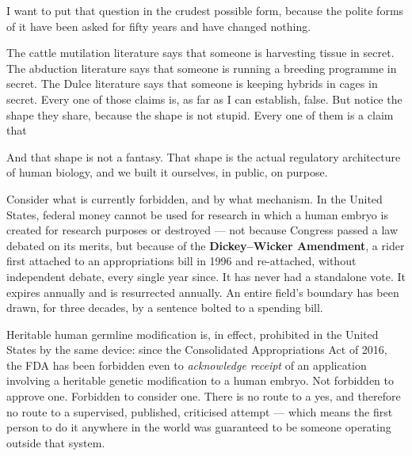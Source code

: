 I want to put that question in the crudest possible form, because the polite forms of it have been
asked for fifty years and have changed nothing.

The cattle mutilation literature says that someone is harvesting tissue in secret. The abduction
literature says that someone is running a breeding programme in secret. The Dulce literature says
that someone is keeping hybrids in cages in secret. Every one of those claims is, as far as I can
establish, false. But notice the shape they share, because the shape is not stupid. Every one of
them is a claim that 

And that shape is not a fantasy. That shape is the actual regulatory architecture of human
biology, and we built it ourselves, in public, on purpose.

Consider what is currently forbidden, and by what mechanism. In the United States, federal money
cannot be used for research in which a human embryo is created for research purposes or destroyed
--- not because Congress passed a law debated on its merits, but because of the
\textbf{Dickey--Wicker Amendment}, a rider first attached to an appropriations bill in 1996 and
re-attached, without independent debate, every single year since. It has never had a standalone
vote. It expires annually and is resurrected annually. An entire field's boundary has been drawn,
for three decades, by a sentence bolted to a spending bill.

Heritable human germline modification is, in effect, prohibited in the United States by the same
device: since the Consolidated Appropriations Act of 2016, the FDA has been forbidden even to
\emph{acknowledge receipt} of an application involving a heritable genetic modification to a human
embryo. Not forbidden to approve one. Forbidden to consider one. There is no route to a yes, and
therefore no route to a supervised, published, criticised attempt --- which means the first person
to do it anywhere in the world was guaranteed to be someone operating outside that system.

